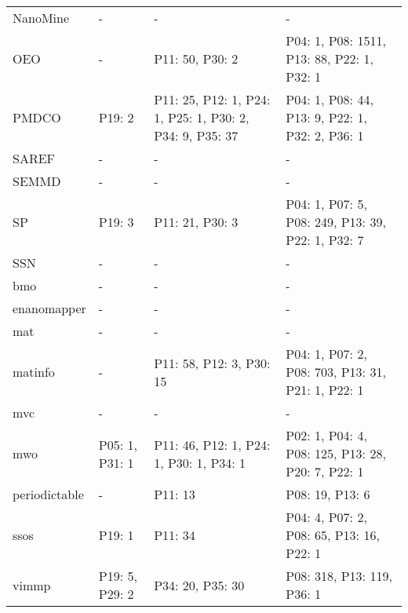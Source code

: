 \begin{tabular}{m{4cm}m{3cm}m{3cm}m{5cm}}
               NanoMine &                       - &                                                        - &                                                 - \\
                    OEO &                       - &                                          P11: 50, P30: 2 &        P04: 1, P08: 1511, P13: 88, P22: 1, P32: 1 \\
                  PMDCO &                  P19: 2 & P11: 25, P12: 1, P24: 1, P25: 1, P30: 2, P34: 9, P35: 37 &   P04: 1, P08: 44, P13: 9, P22: 1, P32: 2, P36: 1 \\
                  SAREF &                       - &                                                        - &                                                 - \\
                  SEMMD &                       - &                                                        - &                                                 - \\
                     SP &                  P19: 3 &                                          P11: 21, P30: 3 & P04: 1, P07: 5, P08: 249, P13: 39, P22: 1, P32: 7 \\
                    SSN &                       - &                                                        - &                                                 - \\
                    bmo &                       - &                                                        - &                                                 - \\
            enanomapper &                       - &                                                        - &                                                 - \\
                    mat &                       - &                                                        - &                                                 - \\
                matinfo &                       - &                                 P11: 58, P12: 3, P30: 15 & P04: 1, P07: 2, P08: 703, P13: 31, P21: 1, P22: 1 \\
                    mvc &                       - &                                                        - &                                                 - \\
                    mwo &          P05: 1, P31: 1 &                  P11: 46, P12: 1, P24: 1, P30: 1, P34: 1 & P02: 1, P04: 4, P08: 125, P13: 28, P20: 7, P22: 1 \\
          periodictable &                       - &                                                  P11: 13 &                                   P08: 19, P13: 6 \\
                   ssos &                  P19: 1 &                                                  P11: 34 &          P04: 4, P07: 2, P08: 65, P13: 16, P22: 1 \\
                  vimmp &          P19: 5, P29: 2 &                                         P34: 20, P35: 30 &                        P08: 318, P13: 119, P36: 1 \\
\bottomrule
\end{tabular}
